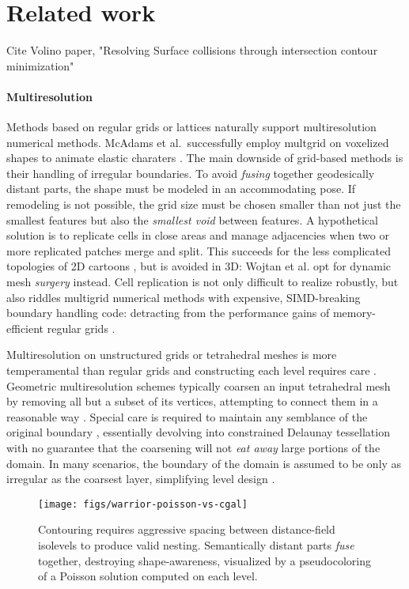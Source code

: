 
\section{Related work}
\label{sec:related}

Cite Volino paper, "Resolving Surface collisions through intersection contour
minimization"

\paragraph{Multiresolution}
%
Methods based on regular grids or lattices naturally support multiresolution numerical methods.
%
McAdams et al.\ successfully employ multgrid on voxelized shapes to animate
elastic charaters .
%
The main downside of grid-based methods is their handling of irregular
boundaries.
%
To avoid \emph{fusing} together geodesically distant parts, the
shape must be modeled in an accommodating pose. If remodeling is not
possible, the grid size must be chosen smaller than not just the smallest
features but also the \emph{smallest void} between features.
%
A hypothetical solution is to replicate cells in close areas and manage
adjacencies when two or more replicated patches merge and split.
%
This succeeds for the less complicated topologies of 2D cartoons
\cite{Sykora09}, but is avoided in 3D: Wojtan et al.
 opt for dynamic mesh \emph{surgery} instead.
%
Cell replication is not only difficult to realize robustly, but also riddles
multigrid numerical methods with expensive, SIMD-breaking boundary handling
code: detracting from the performance gains of memory-efficient regular grids
\cite{Demmel04}.

Multiresolution on unstructured grids or tetrahedral meshes is more
temperamental than regular grids and constructing each level requires care
\cite{fish1995efficient}.
%
Geometric multiresolution schemes typically coarsen an input tetrahedral mesh
by removing all but a subset of its vertices, attempting to connect them in a
reasonable way \cite{guillard1993,Adams:1999:PMS}. Special care is required to
maintain any semblance of the original boundary \cite{Brune:2011}, essentially
devolving into constrained Delaunay tessellation with no guarantee that the
coarsening will not \emph{eat away} large portions of the domain.
%
In many scenarios, the boundary of the domain is assumed to be only as
irregular as the coarsest layer, simplifying level design \cite{feng1997non}.

\begin{figure}[b]
  \texttt{[image: figs/warrior-poisson-vs-cgal]}
  \caption{Contouring requires aggressive spacing between distance-field
  isolevels to produce valid nesting. Semantically distant parts \emph{fuse}
  together, destroying shape-awareness, visualized by a pseudocoloring of a
  Poisson solution computed on each level.} 
  \label{fig:warrior-poisson}
\end{figure}

